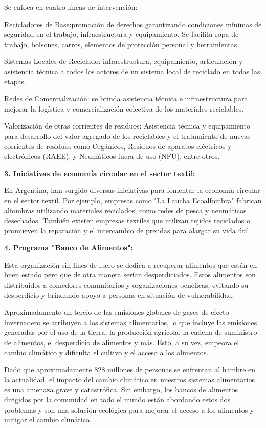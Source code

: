 \documentclass[runningheads]{llncs}
\begin{document}
Se enfoca en cuatro líneas de intervención:

Recicladores de Base:promoción de derechos garantizando condiciones mínimas de seguridad en el trabajo, infraestructura y equipamiento. Se facilita ropa de trabajo, bolsones, carros, elementos de protección personal y herramientas.

Sistemas Locales de Reciclado: infraestructura, equipamiento, articulación y asistencia técnica a todos los actores de un sistema local de reciclado en todas las etapas.

Redes de Comercialización: se brinda asistencia técnica e infraestructura para mejorar la logística y comercialización colectiva de los materiales reciclables.

Valorización de otras corrientes de residuos: Asistencia técnica y equipamiento para desarrollo del valor agregado de los reciclables y el tratamiento de nuevas corrientes de residuos como Orgánicos, Residuos de aparatos eléctricos y electrónicos (RAEE), y Neumáticos fuera de uso (NFU), entre otros.

\textbf{3. Iniciativas de economía circular en el sector textil:}

En Argentina, han surgido diversas iniciativas para fomentar la economía circular en el sector textil. Por ejemplo, empresas como "La Laucha Ecoalfombra" fabrican alfombras utilizando materiales reciclados, como redes de pesca y neumáticos desechados. También existen empresas textiles que utilizan tejidos reciclados o promueven la reparación y el intercambio de prendas para alargar su vida útil.

\textbf{4. Programa "Banco de Alimentos":}

Esta organización sin fines de lucro se dedica a recuperar alimentos que están en buen estado pero que de otra manera serían desperdiciados. Estos alimentos son distribuidos a comedores comunitarios y organizaciones benéficas, evitando su desperdicio y brindando apoyo a personas en situación de vulnerabilidad.

Aproximadamente un tercio de las emisiones globales de gases de efecto invernadero se atribuyen a los sistemas alimentarios, lo que incluye las emisiones generadas por el uso de la tierra, la producción agrícola, la cadena de suministro de alimentos, el desperdicio de alimentos y más. Esto, a su vez, empeora el cambio climático y dificulta el cultivo y el acceso a los alimentos.

Dado que aproximadamente 828 millones de personas se enfrentan al hambre en la actualidad, el impacto del cambio climático en nuestros sistemas alimentarios es una amenaza grave y catastrófica. Sin embargo, los bancos de alimentos dirigidos por la comunidad en todo el mundo están abordando estos dos problemas y son una solución ecológica para mejorar el acceso a los alimentos y mitigar el cambio climático.
\end{document}
